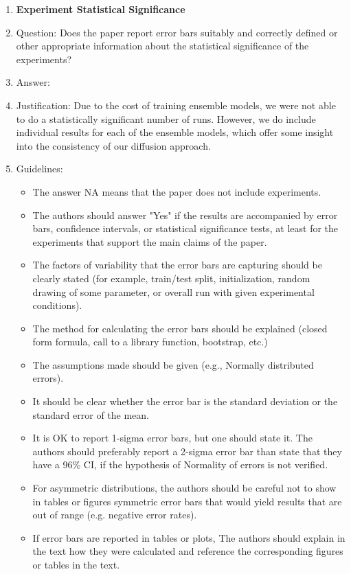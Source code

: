 \documentclass{article}
\begin{document}
\begin{enumerate}
\item {\bf Experiment Statistical Significance}
    \item[] Question: Does the paper report error bars suitably and correctly defined or other appropriate information about the statistical significance of the experiments?
    \item[] Answer: \answerNo{} %
    \item[] Justification: Due to the cost of training ensemble models, we were not able to do a statistically significant number of runs. However, we do include individual results for each of the ensemble models, which offer some insight into the consistency of our diffusion approach.
    \item[] Guidelines:
    \begin{itemize}
        \item The answer NA means that the paper does not include experiments.
        \item The authors should answer "Yes" if the results are accompanied by error bars, confidence intervals, or statistical significance tests, at least for the experiments that support the main claims of the paper.
        \item The factors of variability that the error bars are capturing should be clearly stated (for example, train/test split, initialization, random drawing of some parameter, or overall run with given experimental conditions).
        \item The method for calculating the error bars should be explained (closed form formula, call to a library function, bootstrap, etc.)
        \item The assumptions made should be given (e.g., Normally distributed errors).
        \item It should be clear whether the error bar is the standard deviation or the standard error of the mean.
        \item It is OK to report 1-sigma error bars, but one should state it. The authors should preferably report a 2-sigma error bar than state that they have a 96\% CI, if the hypothesis of Normality of errors is not verified.
        \item For asymmetric distributions, the authors should be careful not to show in tables or figures symmetric error bars that would yield results that are out of range (e.g. negative error rates).
        \item If error bars are reported in tables or plots, The authors should explain in the text how they were calculated and reference the corresponding figures or tables in the text.
    \end{itemize}


\end{enumerate}
\end{document}
